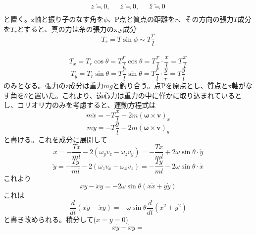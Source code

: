 \documentclass{jsarticle}
\begin{document}
\[z\fallingdotseq0,\hspace{5mm}\dot{z}\fallingdotseq0,\hspace{5mm}\ddot{z}\fallingdotseq0\]
と置く。z軸と振り子のなす角を\(\phi\)、P点と質点の距離を\(r\)、その方向の張力\(T\)成分を\(T_{r}\)とすると、真の力は糸の張力のx,y成分
\[T_{r}=T\sin\phi\sim T\frac{r}{l}\]
\\
\[T_{x}=T_{r}\cos\theta=T\frac{r}{l}\cos\theta=T\frac{r}{l}\cdot\frac{x}{l}=T\frac{x}{l}\]
\[T_{y}=T_{r}\sin\theta=T\frac{r}{l}\sin\theta=T\frac{r}{l}\cdot\frac{y}{r}=T\frac{y}{l}\]
のみとなる。張力のz成分は重力\(mg\)と釣り合う。点Pを原点とし、質点とx軸がなす角を\(\theta\)と置いた。これより、遠心力は重力の中に僅かに取り込まれているとし、コリオリ力のみを考慮すると、運動方程式は
\[m\ddot{x}=-T\frac{x}{l}-2m(\bm{\omega\times\bm{v}})_{x}\]
\[m\ddot{y}=-T\frac{y}{l}-2m(\bm{\omega\times\bm{v}})_{y}\]
と書ける。これを成分に展開して
\[\ddot{x}=-\frac{Tx}{ml}-2(\omega_{y}v_{z}-\omega_{z}v_{y})=-\frac{Tx}{ml}+2\omega\sin\theta\cdot\dot{y}\]
\[\ddot{y}=-\frac{Ty}{ml}-2(\omega_{z}v_{x}-\omega_{x}v_{z})=-\frac{Ty}{ml}-2\omega\sin\theta\cdot\dot{x}\]
これより
\[x\ddot{y}-\ddot{x}y=-2\omega\sin\theta(x\dot{x}+y\dot{y})\]
これは
\[\frac{d}{dt}(x\dot{y}-\dot{x}y)=-\omega\sin\theta\frac{d}{dt}(x^2+y^2)\]
と書き改められる。積分して(\(x=y=0\))
\[x\dot{y}-\dot{x}y=\]
\end{document}
